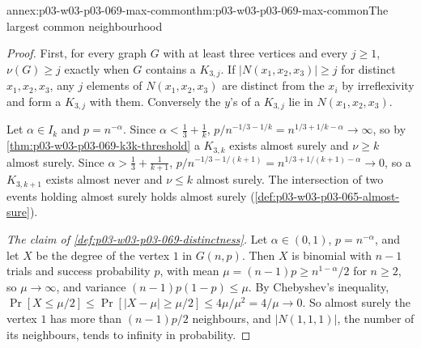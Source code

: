 \begin{annexitem}{annex:p03-w03-p03-069-max-common}{thm:p03-w03-p03-069-max-common}{The largest common neighbourhood}
\begin{proof}
First, for every graph \(G\) with at least three vertices and every
\(j\geq1\), \(\nu(G)\geq j\) exactly when \(G\) contains a \(K_{3,j}\).
If \(|N(x_1,x_2,x_3)|\geq j\) for distinct \(x_1,x_2,x_3\), any \(j\)
elements of \(N(x_1,x_2,x_3)\) are distinct from the \(x_i\) by
irreflexivity and form a \(K_{3,j}\) with them.  Conversely the \(y\)'s of a
\(K_{3,j}\) lie in \(N(x_1,x_2,x_3)\).

Let \(\alpha\in I_k\) and \(p=n^{-\alpha}\).  Since
\(\alpha<\tfrac13+\tfrac1k\),
\(p/n^{-1/3-1/k}=n^{1/3+1/k-\alpha}\to\infty\), so by
\cref{thm:p03-w03-p03-069-k3k-threshold} a \(K_{3,k}\) exists almost surely
and \(\nu\geq k\) almost surely.  Since
\(\alpha>\tfrac13+\tfrac1{k+1}\),
\(p/n^{-1/3-1/(k+1)}=n^{1/3+1/(k+1)-\alpha}\to0\), so a \(K_{3,k+1}\) exists
almost never and \(\nu\leq k\) almost surely.  The intersection of two
events holding almost surely holds almost surely
(\cref{def:p03-w03-p03-065-almost-sure}).

\emph{The claim of \cref{def:p03-w03-p03-069-distinctness}.}  Let
\(\alpha\in(0,1)\), \(p=n^{-\alpha}\), and let \(X\) be the degree of the
vertex \(1\) in \(G(n,p)\).  Then \(X\) is binomial with \(n-1\) trials and
success probability \(p\), with mean \(\mu=(n-1)p\geq n^{1-\alpha}/2\) for
\(n\geq2\), so \(\mu\to\infty\), and variance \((n-1)p(1-p)\leq\mu\).  By
Chebyshev's inequality,
\(\Pr[X\leq\mu/2]\leq\Pr[|X-\mu|\geq\mu/2]\leq4\mu/\mu^2=4/\mu\to0\).  So
almost surely the vertex \(1\) has more than \((n-1)p/2\) neighbours, and
\(|N(1,1,1)|\), the number of its neighbours, tends to infinity in
probability.
\end{proof}
\end{annexitem}

